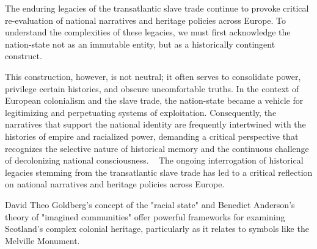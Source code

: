 \documentclass{scrartcl}
\begin{document}
 The enduring legacies of the transatlantic slave trade continue to provoke critical re-evaluation of national narratives and heritage policies across Europe. To understand the complexities of these legacies, we must first acknowledge the nation-state not as an immutable entity, but as a historically contingent construct. 

This construction, however, is not neutral; it often serves to consolidate power, privilege certain histories, and obscure uncomfortable truths. In the context of European colonialism and the slave trade, the nation-state became a vehicle for legitimizing and perpetuating systems of exploitation. Consequently, the narratives that support the national identity are frequently intertwined with the histories of empire and racialized power, demanding a critical perspective that recognizes the selective nature of historical memory and the continuous challenge of decolonizing national consciousness.  
The ongoing interrogation of historical legacies stemming from the transatlantic slave trade has led to a critical reflection  on national narratives and heritage policies across Europe. 

David Theo Goldberg's concept of the "racial state" and Benedict Anderson's theory of "imagined communities" offer powerful frameworks for examining Scotland's complex colonial heritage, particularly as it relates to symbols like the Melville Monument.
\end{document}
